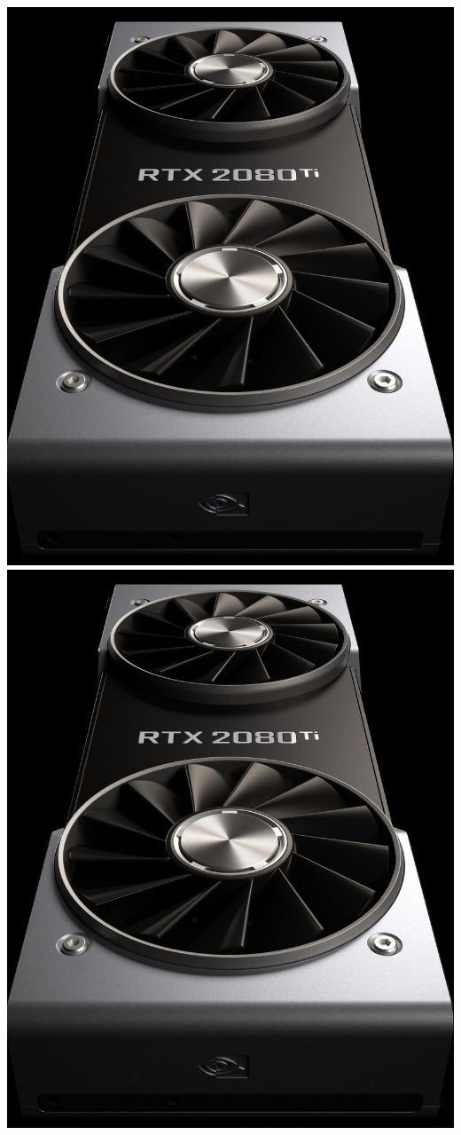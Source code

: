 \documentclass[\beamerclass,aspectratio=1610]{beamer}
\begin{document}
\begin{frame}
\begin{columns}
\includegraphics[width=0.8\columnwidth]{2080.jpg}\\
\includegraphics[width=0.8\columnwidth]{2080.jpg}\\


\end{columns}
\end{frame}
\end{document}
